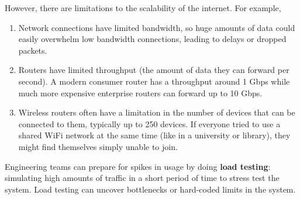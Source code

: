 \documentclass{article}
\begin{document}
  However, there are limitations to the scalability of the internet. For example, 
  \begin{enumerate}
      \item Network connections have limited bandwidth, so huge amounts of data could easily overwhelm low bandwidth connections, leading to delays or dropped packets. 
      \item Routers have limited throughput (the amount of data they can forward per second). A modern consumer router has a throughput around 1 Gbps while much more expensive enterprise routers can forward up to 10 Gbps. 
      \item Wireless routers often have a limitation in the number of devices that can be connected to them, typically up to 250 devices. If everyone tried to use a shared WiFi network at the same time (like in a university or library), they might find themselves simply unable to join.
  \end{enumerate}

  \begin{definition}
  Engineering teams can prepare for spikes in usage by doing \textbf{load testing}: simulating high amounts of traffic in a short period of time to stress test the system. Load testing can uncover bottlenecks or hard-coded limits in the system. 
  \end{definition}
\end{document}
